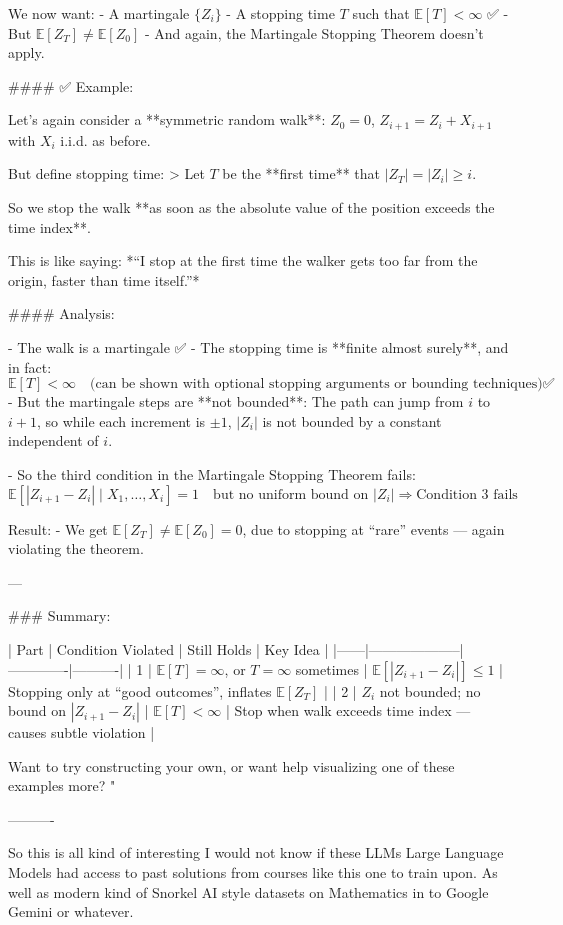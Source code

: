 \begin{enumerate}
\begin{shaded}
We now want:
- A martingale $\{Z_i\}$  
- A stopping time $T$ such that $\mathbb{E}[T] < \infty$ ✅  
- But $\mathbb{E}[Z_T] \ne \mathbb{E}[Z_0]$  
- And again, the Martingale Stopping Theorem doesn't apply.

#### ✅ Example:

Let's again consider a **symmetric random walk**: $Z_0 = 0$, $Z_{i+1} = Z_i + X_{i+1}$ with $X_i$ i.i.d. as before.

But define stopping time:
> Let $T$ be the **first time** that $|Z_T| = |Z_i| \ge i$.

So we stop the walk **as soon as the absolute value of the position exceeds the time index**.

This is like saying: *“I stop at the first time the walker gets too far from the origin, faster than time itself.”*

#### Analysis:

- The walk is a martingale ✅  
- The stopping time is **finite almost surely**, and in fact:
  $$
  \mathbb{E}[T] < \infty \quad \text{(can be shown with optional stopping arguments or bounding techniques)} ✅
  $$  
- But the martingale steps are **not bounded**:  
  The path can jump from $i$ to $i+1$, so while each increment is $\pm 1$, $|Z_i|$ is not bounded by a constant independent of $i$.

- So the third condition in the Martingale Stopping Theorem fails:  
  $$
  \mathbb{E}[|Z_{i+1} - Z_i| \mid X_1, \dots, X_i] = 1 \quad \text{but no uniform bound on } |Z_i| \Rightarrow \text{Condition 3 fails}
  $$

Result:
- We get $\mathbb{E}[Z_T] \ne \mathbb{E}[Z_0] = 0$, due to stopping at “rare” events — again violating the theorem.

---

### Summary:

| Part | Condition Violated | Still Holds | Key Idea |
|------|--------------------|-------------|----------|
| 1 | $\mathbb{E}[T] = \infty$, or $T = \infty$ sometimes | $\mathbb{E}[|Z_{i+1} - Z_i|] \le 1$ | Stopping only at “good outcomes”, inflates $\mathbb{E}[Z_T]$ |
| 2 | $Z_i$ not bounded; no bound on $|Z_{i+1} - Z_i|$ | $\mathbb{E}[T] < \infty$ | Stop when walk exceeds time index — causes subtle violation |

Want to try constructing your own, or want help visualizing one of these examples more?
"

\fi
\end{shaded}
\fi

\end{enumerate}


----------

So this is all kind of interesting I would not know if these LLMs Large Language Models had access to past solutions from courses like this one to train upon. As well as modern kind of Snorkel AI style datasets on Mathematics in to Google Gemini or whatever.